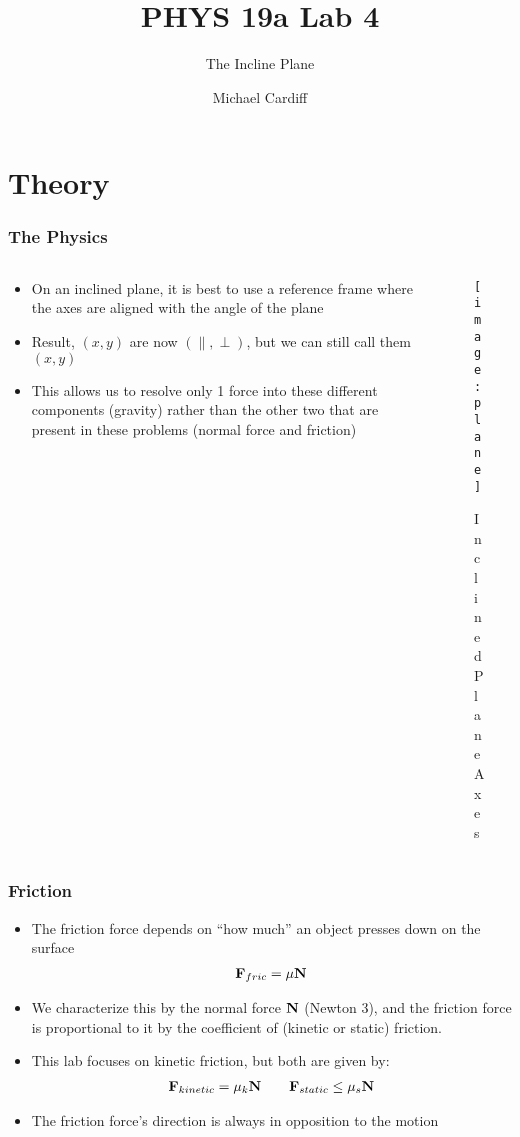 \documentclass[aspectratio=169]{beamer}
\title{PHYS 19a Lab 4}
\author{Michael Cardiff}
\subtitle{The Incline Plane}
\begin{document}
\begin{frame}
  \titlepage
\end{frame}

\section{Theory}
\begin{frame}
  \frametitle{The Physics}
  \begin{columns}
    \begin{column}{0.5\textwidth}
      \begin{itemize}
      \item On an inclined plane, it is best to use a reference frame where the axes are aligned with the angle of the plane
      \item Result, $(x,y)$ are now $(\parallel,\perp)$, but we can still call them $(x,y)$
      \item This allows us to resolve only 1 force into these different components (gravity) rather than the other two that are present in these problems (normal force and friction)
      \end{itemize}
    \end{column}
    \begin{column}{0.5\textwidth}
      \begin{figure}[H]
        \centering
        \texttt{[image: plane]}
        \caption{Inclined Plane Axes}
      \end{figure}
    \end{column}
  \end{columns}
\end{frame}

\begin{frame}
  \frametitle{Friction}
  \begin{itemize}
  \item The friction force depends on ``how much'' an object presses down on the surface
    \begin{align*}
      \vb{F}_{fric}=\mu\vb{N}
    \end{align*}
  \item We characterize this by the normal force $\vb{N}$ (Newton 3), and the friction force is proportional to it by the coefficient of (kinetic or static) friction.
  \item This lab focuses on kinetic friction, but both are given by:
    \begin{align*}
      \vb{F}_{kinetic}=\mu_k\vb{N}\qquad \vb{F}_{static}\leq\mu_s\vb{N}
    \end{align*}
  \item The friction force's direction is always in opposition to the motion
  \end{itemize}
\end{frame}
\end{document}
